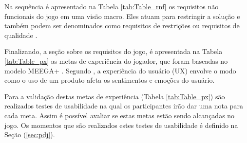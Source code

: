 

\newpage
Na sequência é apresentado na Tabela \ref{tab:Table_rnf} os requisitos não funcionais do jogo em uma visão macro. Eles atuam para restringir a solução e também podem ser denominados como requisitos de restrições ou requisitos de qualidade \cite{Bourque_2014}.



Finalizando, a seção sobre os requisitos do jogo, é apresentada na Tabela \ref{tab:Table_px} as metas de experiência do jogador, que foram baseadas no modelo MEEGA+ \cite{Petri_Wangenheim_2019}. Segundo , a experiência do usuário (UX) envolve o modo como o uso de um produto afeta os sentimentos e emoções do usuário.

{\color{textmodified}
Para a validação destas metas de experiência (Tabela \ref{tab:Table_px}) são realizados testes de usabilidade na qual os participantes irão dar uma nota para cada meta. Assim é possível avaliar se estas metas estão sendo alcançadas no jogo. Os momentos que são realizados estes testes de usabilidade é definido na Seção (\ref{sec:pdj}).
}






\newpage

